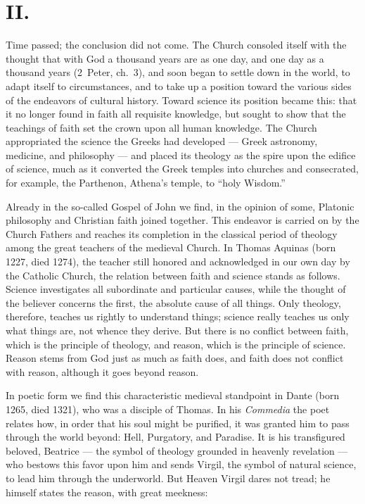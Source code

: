 \documentclass[12pt,a4paper]{article}
\begin{document}
\section*{II.}

Time passed; the conclusion did not come. The Church consoled itself with
the thought that with God a thousand years are as one day, and one day as a
thousand years (2~Peter, ch.~3), and soon began to settle down in the world,
to adapt itself to circumstances, and to take up a position toward the
various sides of the endeavors of cultural history. Toward science its
position became this: that it no longer found in faith all requisite
knowledge, but sought to show that the teachings of faith set the crown upon
all human knowledge. The Church appropriated the science the Greeks had
developed --- Greek astronomy, medicine, and philosophy --- and placed its
theology as the spire upon the edifice of science, much as it converted the
Greek temples into churches and consecrated, for example, the Parthenon,
Athena's temple, to ``holy Wisdom.''

Already in the so-called Gospel of John we find, in the opinion of some,
Platonic philosophy and Christian faith joined together. This endeavor is
carried on by the Church Fathers and reaches its completion in the classical
period of theology among the great teachers of the medieval Church. In
Thomas Aquinas (born 1227, died 1274), the teacher still honored and
acknowledged in our own day by the Catholic Church, the relation between
faith and science stands as follows. Science investigates all subordinate and
particular causes, while the thought of the believer concerns the first, the
absolute cause of all things. Only theology, therefore, teaches us rightly to
understand things; science really teaches us only what things are, not whence
they derive. But there is no conflict between faith, which is the principle of
theology, and reason, which is the principle of science. Reason stems from God
just as much as faith does, and faith does not conflict with reason, although
it goes beyond reason.

In poetic form we find this characteristic medieval standpoint in Dante (born
1265, died 1321), who was a disciple of Thomas. In his \emph{Commedia} the
poet relates how, in order that his soul might be purified, it was granted him
to pass through the world beyond: Hell, Purgatory, and Paradise. It is his
transfigured beloved, Beatrice --- the symbol of theology grounded in heavenly
revelation --- who bestows this favor upon him and sends Virgil, the symbol of
natural science, to lead him through the underworld. But Heaven Virgil dares
not tread; he himself states the reason, with great meekness:
\end{document}
